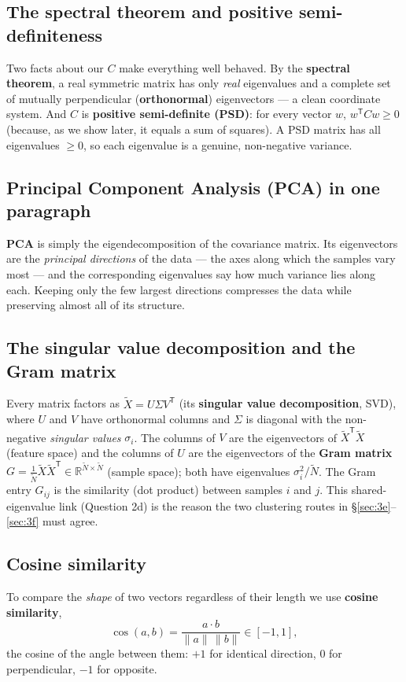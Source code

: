 \documentclass[11pt]{article}
\newcommand{\R}{\mathbb{R}}
\newcommand{\Xt}{\widetilde{X}}
\newcommand{\Nt}{\widetilde{N}}
\newcommand{\norm}[1]{\lVert #1 \rVert}
\newcommand{\T}{^{\mathsf{T}}}
\theoremstyle{definition}\newtheorem{definition}{Definition}[section]
\theoremstyle{plain}\newtheorem{proposition}{Proposition}[section]
\theoremstyle{remark}\newtheorem{remark}{Remark}[section]
\begin{document}
\subsection{The spectral theorem and positive semi-definiteness}
Two facts about our $C$ make everything well behaved. By the \textbf{spectral theorem}, a real
symmetric matrix has only \emph{real} eigenvalues and a complete set of mutually perpendicular
(\textbf{orthonormal}) eigenvectors --- a clean coordinate system. And $C$ is \textbf{positive
semi-definite (PSD)}: for every vector $w$, $w\T C w\ge0$ (because, as we show later, it equals
a sum of squares). A PSD matrix has all eigenvalues $\ge0$, so each eigenvalue is a genuine,
non-negative variance.

\subsection{Principal Component Analysis (PCA) in one paragraph}
\textbf{PCA} is simply the eigendecomposition of the covariance matrix. Its eigenvectors are
the \emph{principal directions} of the data --- the axes along which the samples vary most ---
and the corresponding eigenvalues say how much variance lies along each. Keeping only the few
largest directions compresses the data while preserving almost all of its structure.

\subsection{The singular value decomposition and the Gram matrix}
Every matrix factors as $\Xt=U\Sigma V\T$ (its \textbf{singular value decomposition}, SVD),
where $U$ and $V$ have orthonormal columns and $\Sigma$ is diagonal with the non-negative
\emph{singular values} $\sigma_i$. The columns of $V$ are the eigenvectors of
$\Xt\T\Xt$ (feature space) and the columns of $U$ are the eigenvectors of the
\textbf{Gram matrix} $G=\tfrac1{\Nt}\Xt\Xt\T\in\R^{\Nt\times\Nt}$ (sample space); both have
eigenvalues $\sigma_i^2/\Nt$. The Gram entry $G_{ij}$ is the similarity (dot product) between
samples $i$ and $j$. This shared-eigenvalue link (Question 2d) is the reason the two clustering
routes in \S\ref{sec:3e}--\ref{sec:3f} must agree.

\subsection{Cosine similarity}
To compare the \emph{shape} of two vectors regardless of their length we use
\textbf{cosine similarity},
\[
  \cos(a,b)=\frac{a\cdot b}{\norm{a}\,\norm{b}}\in[-1,1],
\]
the cosine of the angle between them: $+1$ for identical direction, $0$ for perpendicular,
$-1$ for opposite.
\end{document}
